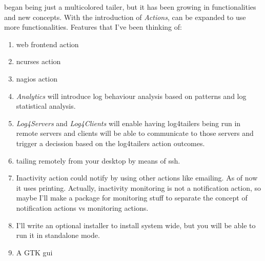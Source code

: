 \logftailer{} began being just a multicolored tailer, but it has been growing in functionalities and new 
concepts. With the introduction of \emph{Actions}, \logftailer{} can be expanded to use more functionalities. 
Features that I've been thinking of:
\begin{enumerate}
 \item web frontend action
 \item ncurses action
 \item nagios action
\item \emph{Analytics} will introduce log behaviour analysis based on patterns and log statistical analysis.
 \item \emph{Log4Servers} and \emph{Log4Clients} will enable having log4tailers being run in remote servers and clients 
will be able to communicate to those servers and trigger a decission based on the log4tailers action outcomes.
\item tailing remotely from your desktop by means of ssh.
\item Inactivity action could notify by using other actions like emailing. As of now it uses printing. Actually, 
inactivity monitoring is not a notification action, so maybe I'll make a package for monitoring stuff to 
separate the concept of notification actions vs monitoring actions.
\item I'll write an optional installer to install \logftailer{} system wide, but you will be able to run it 
in standalone mode.
\item A GTK gui
\end{enumerate}
\newpage
